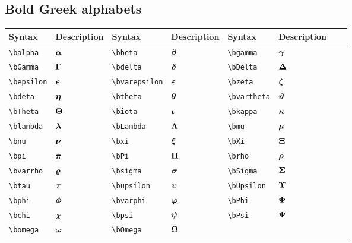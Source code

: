 \documentclass{article}
\begin{document}
	\subsection{Bold Greek alphabets}
	\begin{table}[H]
		\begin{tabular}{|l|l|l|l|l|l|l|l|}
			\hline
			Syntax	&	Description	&	Syntax	&	Description	&	Syntax	&	Description \\
			\hline
			\verb|\balpha|	&	$\boldsymbol{\alpha}$	&	\verb|\bbeta|	&	$\boldsymbol{\beta}$	&	\verb|\bgamma|	&	$\boldsymbol{\gamma}$\\
			\verb|\bGamma|	&	$\boldsymbol{\Gamma}$	&	\verb|\bdelta|	&	$\boldsymbol{\delta}$	&	\verb|\bDelta|	&	$\boldsymbol{\Delta}$\\
			\verb|\bepsilon|	&	$\boldsymbol{\epsilon}$	&	\verb|\bvarepsilon|	&	$\boldsymbol{\varepsilon}$	&	\verb|\bzeta|	&	$\boldsymbol{\zeta}$\\
			\verb|\bdeta|	&	$\boldsymbol{\eta}$	&	\verb|\btheta|	&	$\boldsymbol{\theta}$	&	\verb|\bvartheta|	&	$\boldsymbol{\vartheta}$\\
			\verb|\bTheta|	&	$\boldsymbol{\Theta}$	&	\verb|\biota|	&	$\boldsymbol{\iota}$	&	\verb|\bkappa|	&	$\boldsymbol{\kappa}$\\			
			\verb|\blambda|	&	$\boldsymbol{\lambda}$	&	\verb|\bLambda|	&	$\boldsymbol{\Lambda}$	&	\verb|\bmu|	&	$\boldsymbol{\mu}$\\			
			\verb|\bnu|	&	$\boldsymbol{\nu}$	&	\verb|\bxi|	&	$\boldsymbol{\xi}$	&	\verb|\bXi|	&	$\boldsymbol{\Xi}$\\			
			\verb|\bpi|	&	$\boldsymbol{\pi}$	&	\verb|\bPi|	&	$\boldsymbol{\Pi}$	&	\verb|\brho|	&	$\boldsymbol{\rho}$\\			
			\verb|\bvarrho|	&	$\boldsymbol{\varrho}$	&	\verb|\bsigma|	&	$\boldsymbol{\sigma}$	&	\verb|\bSigma|	&	$\boldsymbol{\Sigma}$\\			
			\verb|\btau|	&	$\boldsymbol{\tau}$	&	\verb|\bupsilon|	&	$\boldsymbol{\upsilon}$	&	\verb|\bUpsilon|	&	$\boldsymbol{\Upsilon}$\\			
			\verb|\bphi|	&	$\boldsymbol{\phi}$	&	\verb|\bvarphi|	&	$\boldsymbol{\varphi}$	&	\verb|\bPhi|	&	$\boldsymbol{\Phi}$\\			
			\verb|\bchi|	&	$\boldsymbol{\chi}$	&	\verb|\bpsi|	&	$\boldsymbol{\psi}$	&	\verb|\bPsi|	&	$\boldsymbol{\Psi}$\\			
			\verb|\bomega|	&	$\boldsymbol{\omega}$	&	\verb|\bOmega|	&	$\boldsymbol{\Omega}$	&		&	\\
			\hline	
		\end{tabular}
	\end{table}
\end{document}

